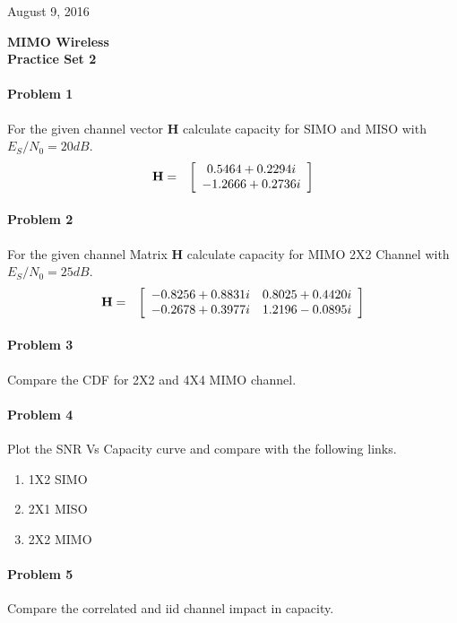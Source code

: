 \documentclass[12pt]{article}
\begin{document}
\hfill August 9, 2016

\begin{center}
{\Large \textbf{MIMO Wireless}}
\\

\textbf{Practice Set 2 }
\end{center}
\paragraph{Problem 1} 
For the given channel vector {\bf H} calculate capacity for SIMO and MISO with $E_S/N_0=20dB$.
\begin{eqnarray*}
{\bf H} &=& \left[
\begin{array}{cc}
0.5464 + 0.2294i \\
-1.2666 + 0.2736i  
\end{array}
\right]
\end{eqnarray*} 

\paragraph{Problem 2} 
For the given channel Matrix {\bf H} calculate capacity for MIMO 2X2 Channel with $E_S/N_0=25dB$.
\begin{eqnarray*}
{\bf H} &=& \left[
\begin{array}{cccc}
-0.8256 + 0.8831i & 0.8025 + 0.4420i \\
-0.2678 + 0.3977i & 1.2196 - 0.0895i
\end{array}
\right]
\end{eqnarray*}

\paragraph{Problem 3} 
Compare the CDF for 2X2 and 4X4 MIMO channel. 

\paragraph{Problem 4} 
Plot the SNR Vs Capacity curve and compare with the following links.
\begin{enumerate}
	\item 1X2 SIMO
	\item 2X1 MISO
	\item 2X2 MIMO
\end{enumerate}
\paragraph{Problem 5} 
Compare the correlated and iid channel impact in capacity.
\end{document}
